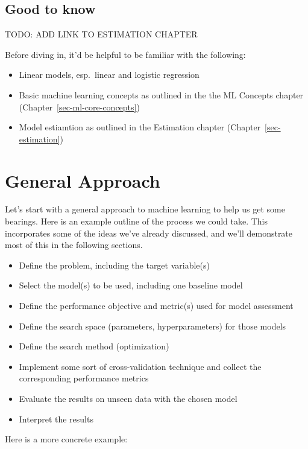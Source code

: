 \documentclass[
  letterpaper,
]{krantz}
\providecommand{\tightlist}{%
  \setlength{\itemsep}{0pt}\setlength{\parskip}{0pt}}\usepackage{longtable,booktabs,array}
\begin{document}
\subsection{Good to know}\label{good-to-know-1}

TODO: ADD LINK TO ESTIMATION CHAPTER

Before diving in, it'd be helpful to be familiar with the following:

\begin{itemize}
\tightlist
\item
  Linear models, esp.~linear and logistic regression
\item
  Basic machine learning concepts as outlined in the the ML Concepts
  chapter (Chapter~\ref{sec-ml-core-concepts})
\item
  Model estiamtion as outlined in the Estimation chapter
  (Chapter~\ref{sec-estimation})
\end{itemize}

\section{General Approach}\label{general-approach}

Let's start with a general approach to machine learning to help us get
some bearings. Here is an example outline of the process we could take.
This incorporates some of the ideas we've already discussed, and we'll
demonstrate most of this in the following sections.

\begin{itemize}
\tightlist
\item
  Define the problem, including the target variable(s)
\item
  Select the model(s) to be used, including one baseline model
\item
  Define the performance objective and metric(s) used for model
  assessment
\item
  Define the search space (parameters, hyperparameters) for those models
\item
  Define the search method (optimization)
\item
  Implement some sort of cross-validation technique and collect the
  corresponding performance metrics
\item
  Evaluate the results on unseen data with the chosen model
\item
  Interpret the results
\end{itemize}

Here is a more concrete example:
\end{document}
